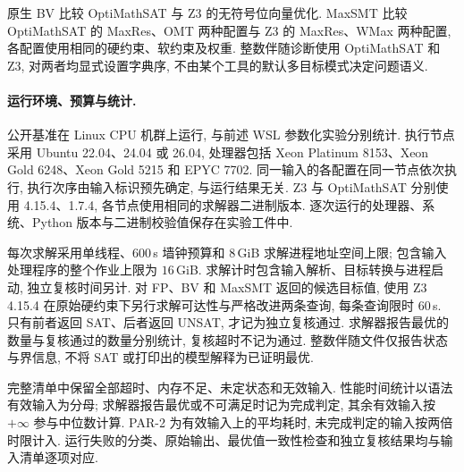 原生 BV 比较 OptiMathSAT 与 Z3 的无符号位向量优化. MaxSMT 比较 OptiMathSAT 的 MaxRes、OMT 两种配置与 Z3 的 MaxRes、WMax 两种配置, 各配置使用相同的硬约束、软约束及权重. 整数伴随诊断使用 OptiMathSAT 和 Z3, 对两者均显式设置字典序, 不由某个工具的默认多目标模式决定问题语义.

\paragraph{运行环境、预算与统计.}
公开基准在 Linux CPU 机群上运行, 与前述 WSL 参数化实验分别统计. 执行节点采用 Ubuntu 22.04、24.04 或 26.04, 处理器包括 Xeon Platinum 8153、Xeon Gold 6248、Xeon Gold 5215 和 EPYC 7702. 同一输入的各配置在同一节点依次执行, 执行次序由输入标识预先确定, 与运行结果无关. Z3 与 OptiMathSAT 分别使用 4.15.4、1.7.4, 各节点使用相同的求解器二进制版本. 逐次运行的处理器、系统、Python 版本与二进制校验值保存在实验工件中.

每次求解采用单线程、$600$\,s 墙钟预算和 $8$\,GiB 求解进程地址空间上限; 包含输入处理程序的整个作业上限为 $16$\,GiB. 求解计时包含输入解析、目标转换与进程启动, 独立复核时间另计. 对 FP、BV 和 MaxSMT 返回的候选目标值, 使用 Z3 4.15.4 在原始硬约束下另行求解可达性与严格改进两条查询, 每条查询限时 $60$\,s. 只有前者返回 SAT、后者返回 UNSAT, 才记为独立复核通过. 求解器报告最优的数量与复核通过的数量分别统计, 复核超时不记为通过. 整数伴随文件仅报告状态与界信息, 不将 SAT 或打印出的模型解释为已证明最优.

完整清单中保留全部超时、内存不足、未定状态和无效输入. 性能时间统计以语法有效输入为分母; 求解器报告最优或不可满足时记为完成判定, 其余有效输入按 $+\infty$ 参与中位数计算. PAR-2 为有效输入上的平均耗时, 未完成判定的输入按两倍时限计入. 运行失败的分类、原始输出、最优值一致性检查和独立复核结果均与输入清单逐项对应.
